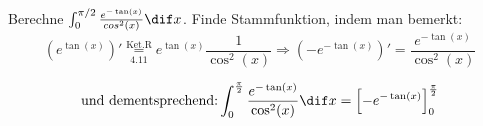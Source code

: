 \begin{example}
    Berechne $\int_0^{\pi/2} \frac{e^{-\tan (x)}}{cos^2(x)} \dif x$. Finde Stammfunktion, indem man bemerkt:
    \begin{equation*}
        \left(e^{\tan(x)}\right)' \underset{4.11}{\overset{\text{Ket.R}}{=}} e^{\tan(x)} \frac{1}{\cos^2(x)} \Longrightarrow \left(-e^{-\tan(x)}\right)' = \frac{e^{-\tan(x)}}{\cos^2(x)}
    \end{equation*}
    
    \begin{equation*}
       \text{und dementsprechend:} \int_0^{\frac{\pi}{2}} \frac{e^{-\tan (x)}}{\cos^2(x)} \dif x = \left[-e^{-\tan(x)}\right]_0^{\frac{\pi}{2}}
    \end{equation*}
\end{example}